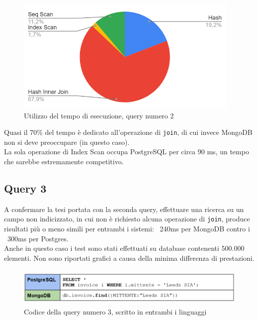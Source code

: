 \begin{figure}[htbp]
\begin{center}
\includegraphics[height=15em]{immagini/query/query2_results2.png}
\caption{Utilizzo del tempo di esecuzione, query numero 2}
\end{center}
\end{figure}

\noindent Quasi il 70\% del tempo è dedicato all'operazione di \texttt{join}, di cui invece MongoDB non si deve preoccupare (in questo caso).\\
La sola operazione di Index Scan occupa PostgreSQL per circa 90 ms, un tempo che sarebbe estremamente competitivo.\\


\subsection{Query 3}
A confermare la tesi portata con la seconda query, effettuare una ricerca su un campo non indicizzato, in cui non è richiesto alcuna operazione di \texttt{join}, produce risultati più o meno simili per entrambi i sistemi: ~240ms per MongoDB contro i ~300ms per Postgres.\\
Anche in questo caso i test sono stati effettuati su database contenenti 500.000 elementi. Non sono riportati grafici a causa della minima differenza di prestazioni.\\

\begin{figure}[htbp]
\begin{center}
\includegraphics[height=5em]{immagini/query/query3.png}
\caption{Codice della query numero 3, scritto in entrambi i linguaggi}
\end{center}
\end{figure}

